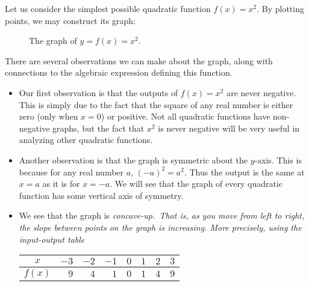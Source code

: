 \begin{eg} Let us consider the simplest possible quadratic function $f(x) = x^2$. By plotting points, we may construct its graph:

\begin{figure}[h]
\centering
{} 
\caption{The graph of $y=f(x) = x^2$.}
\end{figure} 

There are several observations we can make about the graph, along with connections to the algebraic expression defining this function. 
\begin{itemize}
\item Our first observation is that the outputs of $f(x) = x^2$ are never negative. This is simply due to the fact that the square of any real number is either zero (only when $x=0$) or positive. Not all quadratic functions have non-negative graphs, but the fact that $x^2$ is never negative will be very useful in analyzing other quadratic functions. 
\item Another observation is that the graph is symmetric about the $y$-axis. This is because for any real number $a$, $(-a)^2 = a^2$. Thus the output is the same at $x=a$ as it is for $x=-a$. We will see that the graph of every quadratic function has some vertical axis of symmetry.
\item We see that the graph is \it{concave-up}.\ \normalfont That is, as you move from left to right, the slope between points on the graph is increasing. More precisely, using the input-output table\\
\begin{center}
\begin{tabular}{|c||r|r|r|r|r|r|r|}
\hline $x$ & $-3$ & $-2$ & $-1$ & $0$ & $1$ & $2$ & $3$\\
\hline $f(x)$ & $9$ & $4$ & $1$ & $0$ & $1$ & $4$ & $9$\\
\hline
\end{tabular}
\end{center}


\end{itemize}
\end{eg}
